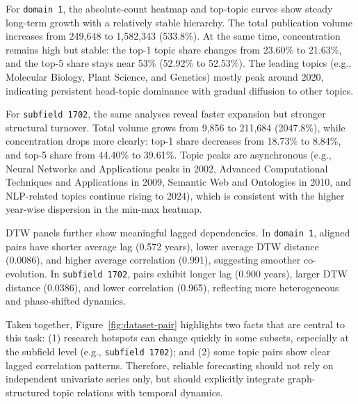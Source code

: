 \documentclass[runningheads]{llncs}
\begin{document}
\FloatBarrier

For \texttt{domain 1}, the absolute-count heatmap and top-topic curves show steady long-term growth with a relatively stable hierarchy. The total publication volume increases from 249,648 to 1,582,343 (533.8\%). At the same time, concentration remains high but stable: the top-1 topic share changes from 23.60\% to 21.63\%, and the top-5 share stays near 53\% (52.92\% to 52.53\%). The leading topics (e.g., Molecular Biology, Plant Science, and Genetics) mostly peak around 2020, indicating persistent head-topic dominance with gradual diffusion to other topics.

For \texttt{subfield 1702}, the same analyses reveal faster expansion but stronger structural turnover. Total volume grows from 9,856 to 211,684 (2047.8\%), while concentration drops more clearly: top-1 share decreases from 18.73\% to 8.84\%, and top-5 share from 44.40\% to 39.61\%. Topic peaks are asynchronous (e.g., Neural Networks and Applications peaks in 2002, Advanced Computational Techniques and Applications in 2009, Semantic Web and Ontologies in 2010, and NLP-related topics continue rising to 2024), which is consistent with the higher year-wise dispersion in the min-max heatmap.

DTW panels further show meaningful lagged dependencies. In \texttt{domain 1}, aligned pairs have shorter average lag (0.572 years), lower average DTW distance (0.0086), and higher average correlation (0.991), suggesting smoother co-evolution. In \texttt{subfield 1702}, pairs exhibit longer lag (0.900 years), larger DTW distance (0.0386), and lower correlation (0.965), reflecting more heterogeneous and phase-shifted dynamics.

Taken together, Figure~\ref{fig:dataset-pair} highlights two facts that are central to this task: (1) research hotspots can change quickly in some subsets, especially at the subfield level (e.g., \texttt{subfield 1702}); and (2) some topic pairs show clear lagged correlation patterns. Therefore, reliable forecasting should not rely on independent univariate series only, but should explicitly integrate graph-structured topic relations with temporal dynamics.
\end{document}
